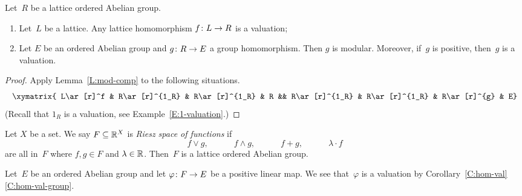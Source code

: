 \documentclass[main.tex]{subfiles}
\begin{document}
\begin{cor}
\label{C:hom-val}
Let~$R$ be a lattice ordered Abelian group.
\begin{enumerate}
\item
\label{C:hom-val-lat}
Let~$L$ be a lattice.
Any lattice homomorphism $f\colon L\rightarrow R$ 
is a valuation;

\item
\label{C:hom-val-group}
Let $E$ be an ordered Abelian group
and $g\colon R\rightarrow E$ a group homomorphism.
Then $g$ is modular.
Moreover,
if~$g$ is positive,
then~$g$ is a valuation.
\end{enumerate}
\end{cor}
\begin{proof}
Apply Lemma~\ref{L:mod-comp} to the following situations.
\begin{equation*}
\xymatrix{
L\ar[r]^f &
R\ar[r]^{1_R} &
R\ar[r]^{1_R} &
R &&
R\ar[r]^{1_R} &
R\ar[r]^{1_R} &
R\ar[r]^{g} &
E}
\end{equation*}
(Recall that $1_R$ is a valuation,
see Example~\ref{E:1-valuation}.)
\end{proof}

%
%
\begin{ex}
\label{E:val-riesz-space-of-functions}
Let $X$ be a set.
We say $F\subseteq \mathbb{R}^X$
is  \emph{Riesz space of functions} if
\begin{equation*}
f\vee g,\quad\qquad 
f\wedge g,\quad\qquad
f+g,\quad\qquad 
\lambda \cdot f
\end{equation*}
are all in~$F$
where $f,g\in F$ and $\lambda \in \mathbb{R}$.
Then~$F$ is a lattice ordered Abelian group.

Let~$E$ be an ordered Abelian group
and let $\varphi\colon F\rightarrow E$ be a positive linear map.
We see that~$\varphi$ is a valuation
 by Corollary~\ref{C:hom-val}\ref{C:hom-val-group}.
\end{ex}
\end{document}
